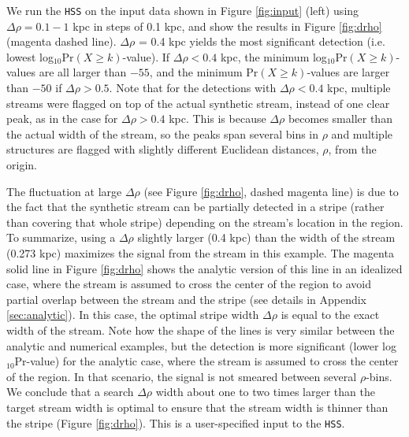 \documentclass[twocolumn]{aastex631}
\begin{document}
We run the \texttt{HSS} on the input data shown in Figure \ref{fig:input} (left) using $\Delta \rho = 0.1-1$ kpc in steps of 0.1 kpc, and show the results in Figure \ref{fig:drho} (magenta dashed line). $\Delta \rho$ = 0.4 kpc yields the most significant detection (i.e. lowest log$_{10}$Pr$(X \geq k)$-value). If $\Delta \rho < 0.4$ kpc, the minimum log$_{10}$Pr$(X \geq k)$-values are all larger than $-55$, and the minimum Pr$(X \geq k)$-values are larger than $-50$ if $\Delta \rho > 0.5$. Note that for the detections with $\Delta \rho < 0.4$ kpc, multiple streams were flagged on top of the actual synthetic stream, instead of one clear peak, as in the case for $\Delta \rho > 0.4$ kpc. This is because  $\Delta \rho$ becomes smaller than the actual width of the stream, so the peaks span several bins in $\rho$ and multiple structures are flagged with slightly different Euclidean distances, $\rho$, from the origin. 

The fluctuation at large $\Delta \rho$ (see Figure \ref{fig:drho}, dashed magenta line) is due to the fact that the synthetic stream can be partially detected in a stripe (rather than covering that whole stripe) depending on the stream's location in the region. To summarize, using a $\Delta \rho$ slightly larger (0.4 kpc) than the width of the stream (0.273 kpc) maximizes the signal from the stream in this example.  The magenta solid line in Figure \ref{fig:drho} shows the analytic version of this line in an idealized case, where the stream is assumed to cross the center of the region to avoid partial overlap between the stream and the stripe (see details in Appendix \ref{sec:analytic}). In this case, the optimal stripe width $\Delta \rho$ is equal to the exact width of the stream. Note how the shape of the lines is very similar between the analytic and numerical examples, but the detection is more significant (lower log$_{10}$Pr-value) for the analytic case, where the stream is assumed to cross the center of the region. In that scenario, the signal is not smeared between several $\rho$-bins. We conclude that a search $\Delta \rho$ width about one to two times larger than the target stream width is optimal to ensure that the stream width is thinner than the stripe (Figure \ref{fig:drho}). This is a user-specified input to the \texttt{HSS}.
\end{document}
